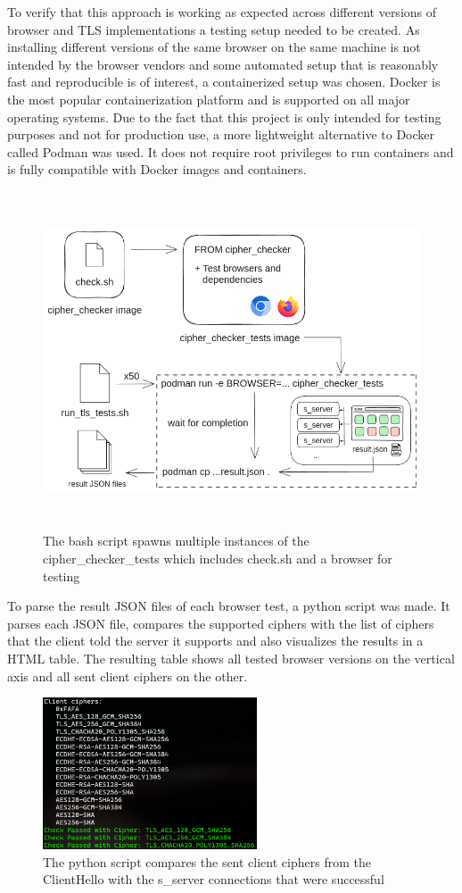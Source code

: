 \documentclass[12pt]{scrbook}
\begin{document}
\clearpage

To verify that this approach is working as expected across different versions of browser
and TLS implementations a testing setup needed to be created. 
As installing different versions of the same browser on the same machine is not intended by the browser vendors and
some automated setup that is reasonably fast and reproducible is of interest, a containerized setup was chosen.
Docker is the most popular containerization platform and is supported on all major operating systems.
Due to the fact that this project is only intended for testing purposes and not for production use, a more lightweight alternative
to Docker called Podman was used. It does not require root privileges to run containers and is fully compatible with Docker images and containers.

\begin{figure}[!h]
  \centering
  \includegraphics[height=10cm]{./images/cipher_checker_tests.png}
  \caption{The bash script spawns multiple instances of the cipher\_checker\_tests which includes check.sh and a browser for testing}
\end{figure}

To parse the result JSON files of each browser test, a python script was made. It parses each JSON file, compares the supported ciphers
with the list of ciphers that the client told the server it supports and also visualizes the results in a HTML table.
The resulting table shows all tested browser versions on the vertical axis and all sent client ciphers on the other.

\begin{figure}[!hb]
  \centering
  \includegraphics[height=45mm]{./images/parse_results.png}
  \caption{The python script compares the sent client ciphers from the ClientHello with the s\_server connections that were successful}
\end{figure}
\end{document}
